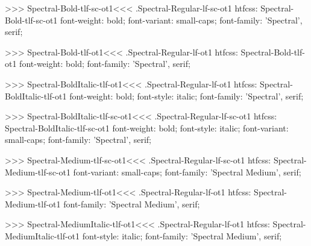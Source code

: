 >>>
\<Spectral-Bold-tlf-sc-ot1\><<<
.Spectral-Regular-lf-sc-ot1
htfcss:  Spectral-Bold-tlf-sc-ot1  font-weight: bold; font-variant: small-caps; font-family: 'Spectral', serif;

>>>
\<Spectral-Bold-tlf-ot1\><<<
.Spectral-Regular-lf-ot1
htfcss:  Spectral-Bold-tlf-ot1  font-weight: bold; font-family: 'Spectral', serif;

>>>
\<Spectral-BoldItalic-tlf-ot1\><<<
.Spectral-Regular-lf-ot1
htfcss:  Spectral-BoldItalic-tlf-ot1  font-weight: bold; font-style: italic; font-family: 'Spectral', serif;

>>>
\<Spectral-BoldItalic-tlf-sc-ot1\><<<
.Spectral-Regular-lf-sc-ot1
htfcss:  Spectral-BoldItalic-tlf-sc-ot1  font-weight: bold; font-style: italic; font-variant: small-caps; font-family: 'Spectral', serif;

>>>
\<Spectral-Medium-tlf-sc-ot1\><<<
.Spectral-Regular-lf-sc-ot1
htfcss:  Spectral-Medium-tlf-sc-ot1  font-variant: small-caps; font-family: 'Spectral Medium', serif;

>>>
\<Spectral-Medium-tlf-ot1\><<<
.Spectral-Regular-lf-ot1
htfcss:  Spectral-Medium-tlf-ot1  font-family: 'Spectral Medium', serif;

>>>
\<Spectral-MediumItalic-tlf-ot1\><<<
.Spectral-Regular-lf-ot1
htfcss:  Spectral-MediumItalic-tlf-ot1  font-style: italic; font-family: 'Spectral Medium', serif;

